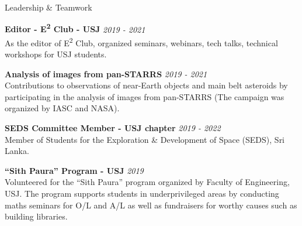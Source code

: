 \documentclass[
	11pt, %
]{./assets/resume} %
\begin{document}

\begin{rSection}{Leadership \& Teamwork}

	\textbf{Editor - E\textsuperscript{2} Club - USJ} \hfill \textit{2019 - 2021} \\ 
	As the editor of  E\textsuperscript{2} Club, organized seminars, webinars, tech talks, technical workshops for USJ students.
	
	\textbf{Analysis of images from pan-STARRS} \hfill \textit{2019 - 2021} \\
	Contributions to observations of near-Earth objects and main belt asteroids by participating in the analysis of images from pan-STARRS (The campaign was organized by IASC and NASA).

	\textbf{SEDS Committee Member - USJ chapter} \hfill \textit{2019 - 2022} \\ 
	Member of Students for the Exploration \& Development of Space (SEDS), Sri Lanka.

	\textbf{“Sith Paura” Program - USJ} \hfill \textit{2019} \\
	Volunteered for the “Sith Paura” program organized by Faculty of Engineering, USJ. The program supports students in underprivileged areas by conducting maths seminars for {O/L} and {A/L} as well as fundraisers for worthy causes such as building libraries.

\end{rSection}







\end{document}
